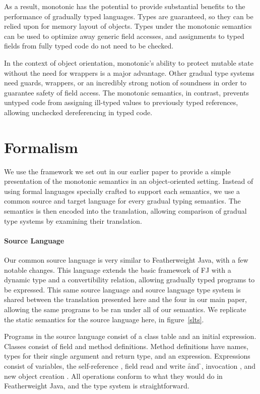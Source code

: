 \documentclass[sigconf]{acmart}
\begin{document}
As a result, monotonic has the potential to provide substantial benefits to
the performance of gradually typed languages. Types are guaranteed, so they
can be relied upon for memory layout of objects. Types under the monotonic
semantics can be used to optimize away generic field accesses, and assignments
to typed fields from fully typed code do not need to be checked.

In the context of object orientation, monotonic's ability to protect mutable
state without the need for wrappers is a major advantage. Other gradual type
systems need guards, wrappers, or an incredibly strong notion of soundness
in order to guarantee safety of field access. The monotonic semantics, in 
contrast, prevents untyped code from assigning ill-typed values to previously
typed references, allowing unchecked dereferencing in typed code.

\section{Formalism}

We use the framework we set out in our earlier paper to provide a simple
presentation of the monotonic semantics in an object-oriented setting. Instead
of using formal languages specially crafted to support each semantics, we use
a common source and target language for every gradual typing semantics. The 
semantics is then encoded into the translation, allowing comparison of gradual 
type systems by examining their translation.

\paragraph{Source Language}

Our common source language is very similar to Featherweight Java, with a few
notable changes. This language extends the basic framework of FJ with a
dynamic type and a convertibility relation, allowing gradually typed programs
to be expressed. This same source language and source language type system
is shared between the translation presented here and the four in our main
paper,  allowing the same programs to be ran under all of our semantics. We
replicate the static semantics for the source language here, in figure~\ref{slts}.

Programs in the source language consist of a class table and an initial
expression. Classes consist of field and method definitions. Method
definitions have names, types for their single argument and return type, and
an expression. Expressions consist of variables, the self-reference \this,
field read and write \FRead\f and \FWrite\f\e, invocation \Call\e\m\e, and new
object creation \New{}. All operations conform to what they would do
in Featherweight Java, and the type system is straightforward. 
\end{document}
